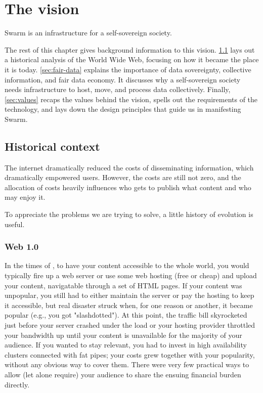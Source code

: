 \chapter{The vision}\label{chap:vision}

Swarm is an infrastructure for a self-sovereign society.  

The rest of this chapter gives background information to this vision. \ref{sec:historical_context} lays out a historical analysis of the World Wide Web, focusing on how it became the place it is today.
\ref{sec:fair-data} explains the importance of data sovereignty, collective information, and fair data economy. It discusses why a self-sovereign society needs infrastructure to host, move, and process data collectively.
Finally, \ref{sec:values} recaps the values behind the vision, spells out the requirements of the technology, and lays down the design principles that guide us in manifesting Swarm.

\section{Historical context}\label{sec:historical_context}
\green{}
The internet dramatically reduced the costs of disseminating information, which dramatically empowered users. However, the costs are still not zero, and the allocation of costs heavily influences who gets to publish what content and who may enjoy it. 

To appreciate the problems we are trying to solve, a little history of  evolution is useful.

\subsection{Web 1.0}\label{sec:web_1}

In the times of , to have your content accessible to the whole world, you would typically fire up a web server or use some web hosting (free or cheap) and upload your content, navigatable through a set of HTML pages. If your content was unpopular, you still had to either maintain the server or pay the hosting to keep it accessible, but real disaster struck when, for one reason or another, it became popular (e.g., you got "slashdotted"). At this point, the traffic bill skyrocketed just before your server crashed under the load or your hosting provider throttled your bandwidth up until your content is unavailable for the majority of your audience. If you wanted to stay relevant, you had to invest in high availability clusters connected with fat pipes; your costs grew together with your popularity, without any obvious way to cover them. There were very few practical ways to allow (let alone require) your audience to share the ensuing financial burden directly.

